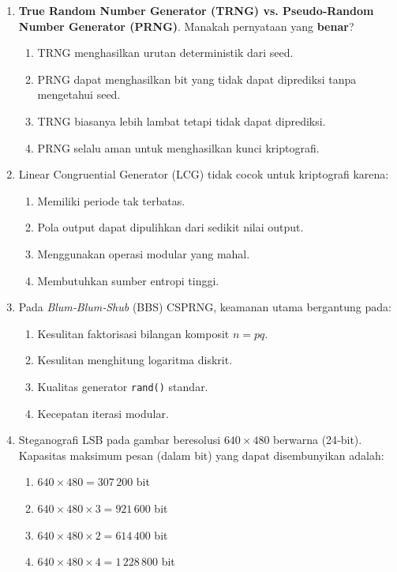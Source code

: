 \documentclass[12pt]{article}
\begin{document}
\begin{enumerate}[label=\textbf{Soal \arabic*.}, leftmargin=*, itemsep=1.5em]

\item \textbf{True Random Number Generator (TRNG) vs. Pseudo‑Random Number Generator (PRNG)}. Manakah pernyataan yang \textbf{benar}?
\begin{enumerate}[label=\Alph*.]
    \item TRNG menghasilkan urutan deterministik dari seed.
    \item PRNG dapat menghasilkan bit yang tidak dapat diprediksi tanpa mengetahui seed.
    \item TRNG biasanya lebih lambat tetapi tidak dapat diprediksi.
    \item PRNG selalu aman untuk menghasilkan kunci kriptografi.
\end{enumerate}

\item Linear Congruential Generator (LCG) tidak cocok untuk kriptografi karena:
\begin{enumerate}[label=\Alph*.]
    \item Memiliki periode tak terbatas.
    \item Pola output dapat dipulihkan dari sedikit nilai output.
    \item Menggunakan operasi modular yang mahal.
    \item Membutuhkan sumber entropi tinggi.
\end{enumerate}

\item Pada \textit{Blum‑Blum‑Shub} (BBS) CSPRNG, keamanan utama bergantung pada:
\begin{enumerate}[label=\Alph*.]
    \item Kesulitan faktorisasi bilangan komposit $n = p q$.
    \item Kesulitan menghitung logaritma diskrit.
    \item Kualitas generator \texttt{rand()} standar.
    \item Kecepatan iterasi modular.
\end{enumerate}

\item Steganografi LSB pada gambar beresolusi $640\times480$ berwarna (24‑bit). Kapasitas maksimum pesan (dalam bit) yang dapat disembunyikan adalah:
\begin{enumerate}[label=\Alph*.]
    \item $640 \times 480 = 307\,200$ bit
    \item $640 \times 480 \times 3 = 921\,600$ bit
    \item $640 \times 480 \times 2 = 614\,400$ bit
    \item $640 \times 480 \times 4 = 1\,228\,800$ bit
\end{enumerate}


\end{enumerate}
\end{document}
